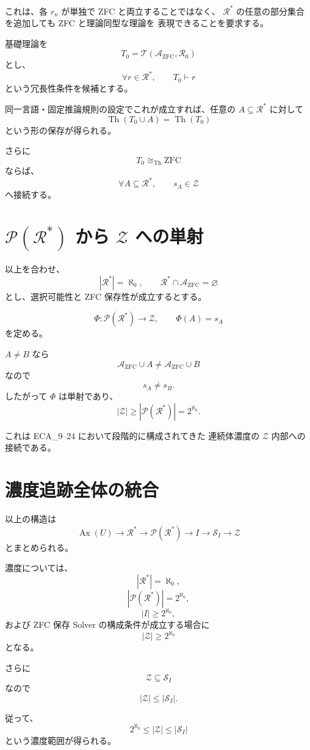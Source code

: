 \documentclass[11pt,a4paper]{article}
\newcommand{\Pow}{\mathcal P}
\newcommand{\Solver}{\mathcal S}
\newcommand{\Zset}{\mathcal Z}
\newcommand{\Rstar}{\mathcal R^*}
\begin{document}
これは、各 $r_n$ が単独で ZFC と両立することではなく、
$\Rstar$ の任意の部分集合を追加しても ZFC と理論同型な理論を
表現できることを要求する。

基礎理論を
\[
T_0=
\mathcal T(\mathcal A_{\mathrm{ZFC}},\mathcal R_0)
\]
とし、
\[
\forall r\in\Rstar,\qquad T_0\vdash r
\]
という冗長性条件を候補とする。

同一言語・固定推論規則の設定でこれが成立すれば、任意の
$A\subseteq\Rstar$ に対して
\[
\operatorname{Th}(T_0\cup A)
=
\operatorname{Th}(T_0)
\]
という形の保存が得られる。

さらに
\[
T_0\cong_{\mathrm{Th}}\mathrm{ZFC}
\]
ならば、
\[
\forall A\subseteq\Rstar,\qquad s_A\in\Zset
\]
へ接続する。

\section{$\Pow(\Rstar)$ から $\Zset$ への単射}

以上を合わせ、
\[
|\Rstar|=\aleph_0,
\qquad
\Rstar\cap\mathcal A_{\mathrm{ZFC}}=\varnothing
\]
とし、選択可能性と ZFC 保存性が成立するとする。

\[
\Phi:\Pow(\Rstar)\to\Zset,
\qquad
\Phi(A)=s_A
\]
を定める。

$A\neq B$ なら
\[
\mathcal A_{\mathrm{ZFC}}\cup A
\neq
\mathcal A_{\mathrm{ZFC}}\cup B
\]
なので
\[
s_A\neq s_B.
\]
したがって $\Phi$ は単射であり、
\[
\boxed{
|\Zset|
\geq
|\Pow(\Rstar)|
=
2^{\aleph_0}
}.
\]

これは ECA_9--24 において段階的に構成されてきた
連続体濃度の $\Zset$ 内部への接続である。

\section{濃度追跡全体の統合}

以上の構造は
\[
\boxed{
\operatorname{Ax}(U)
\longrightarrow
\Rstar
\longrightarrow
\Pow(\Rstar)
\longrightarrow
I
\longrightarrow
\Solver_I
\longrightarrow
\Zset
}
\]
とまとめられる。

濃度については、
\[
|\Rstar|=\aleph_0,
\]
\[
|\Pow(\Rstar)|=2^{\aleph_0},
\]
\[
|I|\geq2^{\aleph_0},
\]
および ZFC 保存 Solver の構成条件が成立する場合に
\[
|\Zset|\geq2^{\aleph_0}
\]
となる。

さらに
\[
\Zset\subseteq\Solver_I
\]
なので
\[
|\Zset|\leq|\Solver_I|.
\]

従って、
\[
\boxed{
2^{\aleph_0}\leq|\Zset|\leq|\Solver_I|
}
\]
という濃度範囲が得られる。
\end{document}
